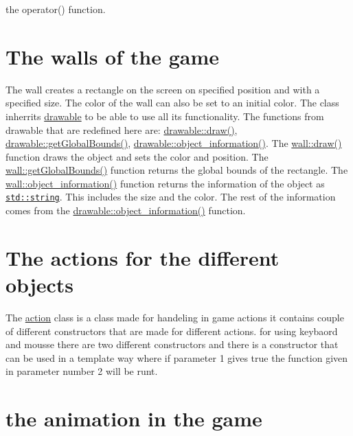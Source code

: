 the operator() function.\hypertarget{index_wall}{}\section{The walls of the game}\label{index_wall}
The wall creates a rectangle on the screen on specified position and with a specified size. The color of the wall can also be set to an initial color. The class inherrits \hyperlink{classdrawable}{drawable} to be able to use all its functionality. The functions from drawable that are redefined here are\+: \hyperlink{classdrawable_a4e49e2c1121704c83ce24c5f48dd910f}{drawable\+::draw()}, \hyperlink{classdrawable_ae013ac0be47538be9ce885d6642daf73}{drawable\+::get\+Global\+Bounds()}, \hyperlink{classdrawable_a2ed0f8bb53f33477f7722efa7bb24583}{drawable\+::object\+\_\+information()}. The \hyperlink{classwall_aa25b8377e1d9a209fabd2271294f05d0}{wall\+::draw()} function draws the object and sets the color and position. The \hyperlink{classwall_a317a464c879cfdf9464bd6f1b62d9101}{wall\+::get\+Global\+Bounds()} function returns the global bounds of the rectangle. The \hyperlink{classwall_aab1de4f144f176b134a967ba08747932}{wall\+::object\+\_\+information()} function returns the information of the object as \href{http://www.cplusplus.com/reference/string/string/string/}{\tt std\+::string}. This includes the size and the color. The rest of the information comes from the \hyperlink{classdrawable_a2ed0f8bb53f33477f7722efa7bb24583}{drawable\+::object\+\_\+information()} function.\hypertarget{index_actions}{}\section{The actions for the different objects}\label{index_actions}
The \hyperlink{classaction}{action} class is a class made for handeling in game actions it contains couple of different constructors that are made for different actions. for using keybaord and mousse there are two different constructors and there is a constructor that can be used in a template way where if parameter 1 gives true the function given in parameter number 2 will be runt.\hypertarget{index_animation}{}\section{the animation in the game}\label{index_animation}
